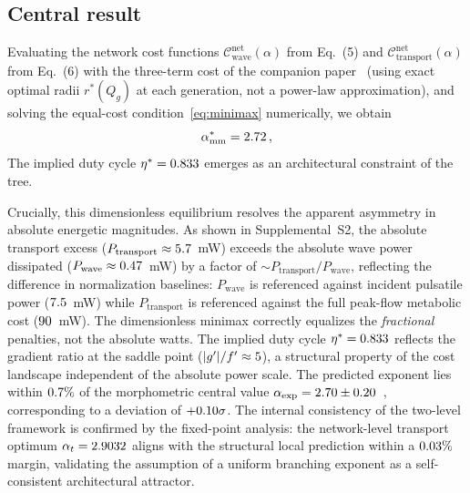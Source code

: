 \documentclass[11pt,a4paper]{article}
\theoremstyle{remark}
\begin{document}
\subsection{Central result}

Evaluating the network cost functions
$\mathcal{C}^{\mathrm{net}}_{\mathrm{wave}}(\alpha)$
from Eq.~(5) and $\mathcal{C}^{\mathrm{net}}_{\mathrm{transport}}(\alpha)$
from Eq.~(6) with the three-term cost of the companion
paper~\cite{Marchesi2026static}
(using exact optimal radii $r^*(Q_g)$ at each generation, not a
power-law approximation), and solving the equal-cost
condition~\eqref{eq:minimax} numerically, we obtain
%
\begin{equation}
  \alpha^*_{\mathrm{mm}} = 2.72 \,,
\label{eq:result}
\end{equation}
%
The implied duty cycle $\eta^* = 0.833$ emerges as an architectural
constraint of the tree.

Crucially, this dimensionless equilibrium resolves the apparent asymmetry in
absolute energetic magnitudes. As shown in Supplemental~S2, the absolute
transport excess ($P_{\mathrm{transport}} \approx 5.7$~mW) exceeds
the absolute wave power dissipated ($P_{\mathrm{wave}} \approx 0.47$~mW)
by a factor of $\sim\!P_{\mathrm{transport}}/P_{\mathrm{wave}}$, reflecting the
difference in normalization baselines: $P_{\mathrm{wave}}$ is referenced against
incident pulsatile power ($7.5$~mW) while $P_{\mathrm{transport}}$ is
referenced against the full peak-flow metabolic cost ($90$~mW). The
dimensionless minimax correctly equalizes the \emph{fractional} penalties, not
the absolute watts. The implied duty cycle $\eta^* = 0.833$ reflects the
gradient ratio at the saddle point ($|g'|/f' \approx 5$), a
structural property of the cost landscape independent of the absolute power
scale.
The predicted exponent lies within $0.7\%$ of the morphometric central
value
$\alpha_{\exp} = 2.70 \pm 0.20$~\cite{Kassab1993},
corresponding to a deviation of $+0.10\sigma$. The internal consistency
of the two-level framework is confirmed by the fixed-point analysis: the
network-level transport optimum $\alpha_t = 2.9032$ aligns with the
structural local prediction within a $0.03\%$ margin,
validating the assumption of a uniform branching exponent as a self-consistent
architectural attractor.
\end{document}
